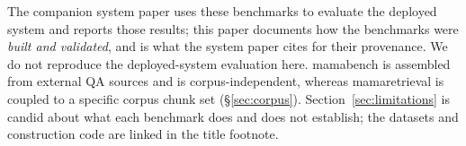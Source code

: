 The companion system paper uses these benchmarks to evaluate the deployed system
and reports those results; this paper documents how the benchmarks were
\emph{built and validated}, and is what the system paper cites for their
provenance. We do not reproduce the deployed-system evaluation here. mamabench
is assembled from external QA sources and is corpus-independent, whereas
mamaretrieval is coupled to a specific corpus chunk set (\S\ref{sec:corpus}).
Section~\ref{sec:limitations} is candid about what each benchmark does and does
not establish; the datasets and construction code are linked in the title
footnote.
